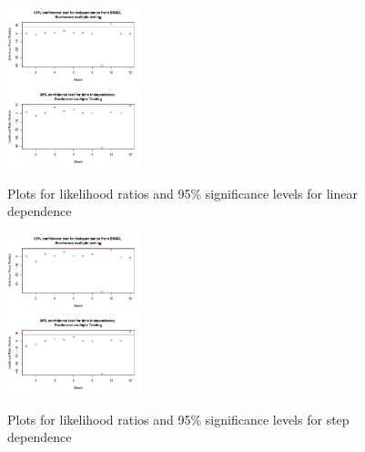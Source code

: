 \documentclass[10pt,conference,compsocconf]{IEEEtran}
\begin{document}
\begin{figure}
	\centering
	\includegraphics[width=0.35\textwidth]{../plots/enso_dependance.pdf}\\
	\includegraphics[width=0.35\textwidth]{../plots/time_dependance.pdf}
	\caption{Plots for likelihood ratios and 95\% significance levels for linear dependence}
	\label{fig:dependance_test}
\end{figure}

\begin{figure}
	\centering
	\includegraphics[width=0.35\textwidth]{../plots/enso_dependance_step.pdf}\\
	\includegraphics[width=0.35\textwidth]{../plots/time_dependance_step.pdf}
	\caption{Plots for likelihood ratios and 95\% significance levels for step dependence}
	\label{fig:dependance_test_step}
\end{figure}
\end{document}
